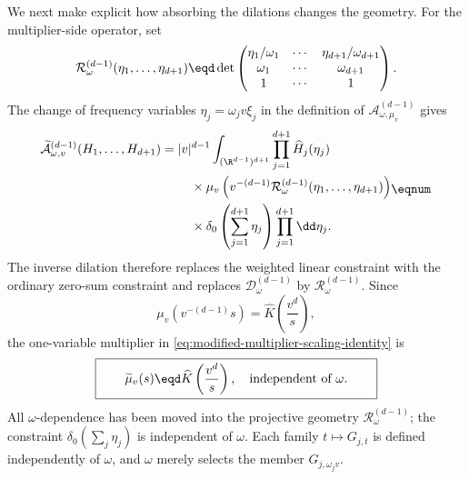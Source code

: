 We next make explicit how absorbing the dilations changes the geometry.
For the multiplier-side operator, set
\[
  \mathcal R_\omega^{(d-1)}(\eta_1,\ldots,\eta_{d+1})
  \eqd
  \det\begin{pmatrix}
    \eta_1/\omega_1&\cdots&\eta_{d+1}/\omega_{d+1}\\
    \omega_1&\cdots&\omega_{d+1}\\
    1&\cdots&1
  \end{pmatrix}.
\]
The change of frequency variables
\(\eta_j=\omega_jv\xi_j\) in the definition of
\(\mathcal A_{\omega,\mu_v}^{(d-1)}\) gives
\[
\begin{aligned}
  \widetilde{\mathcal A}_{\omega,v}^{(d-1)}
  (H_1,\ldots,H_{d+1})
  ={}&|v|^{d-1}
  \int_{(\R^{d-1})^{d+1}}
  \prod_{j=1}^{d+1}\widehat H_j(\eta_j)\\
  &\quad\times
  \mu_v\left(
    v^{-(d-1)}\mathcal R_\omega^{(d-1)}
    (\eta_1,\ldots,\eta_{d+1})
  \right)\\
  &\quad\times
  \delta_0\left(\sum_{j=1}^{d+1}\eta_j\right)
  \prod_{j=1}^{d+1}\dd\eta_j.
\end{aligned}
\eqnum \label{eq:modified-multiplier-scaling-identity}
\]
The inverse dilation therefore replaces the weighted linear constraint with
the ordinary zero-sum constraint and replaces
\(\mathcal D_\omega^{(d-1)}\) by
\(\mathcal R_\omega^{(d-1)}\).  Since
\[
  \mu_v\left(v^{-(d-1)}s\right)
  =\widehat K\left(\frac{v^d}s\right),
\]
the one-variable multiplier in \eqref{eq:modified-multiplier-scaling-identity} is
\[
  \boxed{\qquad
  \widetilde\mu_v(s)
  \eqd\widehat K\left(\frac{v^d}s\right),
  \quad\text{independent of \(\omega\).}
  \qquad}
\]
All \(\omega\)-dependence has been moved into the projective geometry
\(\mathcal R_\omega^{(d-1)}\); the constraint
\(\delta_0(\sum_j\eta_j)\) is independent of \(\omega\).  Each family
\(t\mapsto G_{j,t}\) is defined independently of \(\omega\), and
\(\omega\) merely selects the member \(G_{j,\omega_jv}\).

